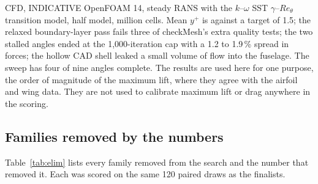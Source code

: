 
\begin{qualitybox}{CFD, INDICATIVE}
OpenFOAM 14, steady RANS with the $k$--$\omega$ SST $\gamma$--$Re_\theta$ transition model, half model,  million cells. Mean $y^+$ is  against a target of 1.5; the relaxed boundary-layer pass fails three of checkMesh's extra quality tests; the two stalled angles ended at the 1,000-iteration cap with a 1.2 to 1.9\,\% spread in forces; the hollow CAD shell leaked a small volume of flow into the fuselage. The sweep has four of nine angles complete. The results are used here for one purpose, the order of magnitude of the maximum lift, where they agree with the airfoil and wing data. They are not used to calibrate maximum lift or drag anywhere in the scoring.
\end{qualitybox}

\Needspace{3.2in}
\subsection{Families removed by the numbers}
Table~\ref{tab:elim} lists every family removed from the search and the number that removed it. Each was scored on the same 120 paired draws as the finalists.

